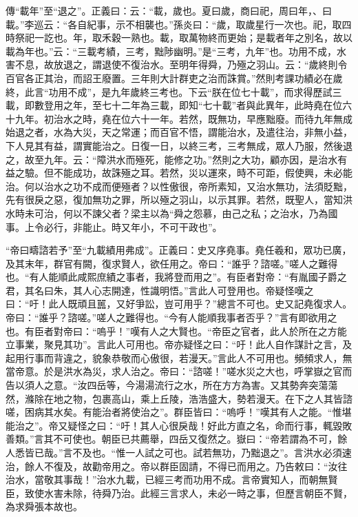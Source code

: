 {\noindent\zhuan{}\fzbyks 傳“載年”至“退之”。正義曰：云：“載，歲也。夏曰歲，商曰祀，周曰年，、曰載。”李巡云：“各自紀事，示不相襲也。”孫炎曰：“歲，取歲星行一次也。祀，取四時祭祀一訖也。年，取禾穀一熟也。載，取萬物終而更始；是載者年之別名，故以載為年也。”云：“三載考績，三考，黜陟幽明。”是“三考，九年”也。功用不成，水害不息，故放退之，謂退使不復治水。至明年得舜，乃殛之羽山。云：“歲終則令百官各正其治，而詔王廢置。三年則大計群吏之治而誅賞。”然則考課功績必在歲終，此言“功用不成”，是九年歲終三考也。下云“朕在位七十載”，而求得歷試三載，即數登用之年，至七十二年為三載，即知“七十載”者與此異年，此時堯在位六十九年。初治水之時，堯在位六十一年。若然，既無功，早應黜廢。而待九年無成始退之者，水為大災，天之常運；而百官不悟，謂能治水，及遣往治，非無小益，下人見其有益，謂實能治之。日復一日，以終三考，三考無成，眾人乃服，然後退之，故至九年。云：“障洪水而殛死，能修之功。”然則之大功，顧亦因，是治水有益之驗。但不能成功，故誅殛之耳。若然，災以運來，時不可距，假使興，未必能治。何以治水之功不成而便殛者？以性傲很，帝所素知，又治水無功，法須貶黜，先有很戾之惡，復加無功之罪，所以殛之羽山，以示其罪。若然，既聖人，當知洪水時未可治，何以不諫父者？梁主以為“舜之怨慕，由己之私；之治水，乃為國事。上令必行，非能止。時又年小，不可干政也”。 \par}

{\noindent\shu{}\fzkt “帝曰疇諮若予”至“九載績用弗成”。正義曰：史又序堯事。堯任羲和，眾功已廣，及其末年，群官有闕，復求賢人，欲任用之。帝曰：“誰乎？諮嗟。”嗟人之難得也。“有人能順此咸熙庶績之事者，我將登而用之”。有臣者對帝：“有胤國子爵之君，其名曰朱，其人心志開達，性識明悟。”言此人可登用也。帝疑怪嘆之曰：“吁！此人既頑且嚚，又好爭訟，豈可用乎？”總言不可也。史又記堯復求人。帝曰：“誰乎？諮嗟。”嗟人之難得也。“今有人能順我事者否乎？”言有即欲用之也。有臣者對帝曰：“嗚乎！”嘆有人之大賢也。“帝臣之官者，此人於所在之方能立事業，聚見其功”。言此人可用也。帝亦疑怪之曰：“吁！此人自作謀計之言，及起用行事而背違之，貌象恭敬而心傲很，若漫天。”言此人不可用也。頻頻求人，無當帝意。於是洪水為災，求人治之。帝曰：“諮嗟！”嗟水災之大也，呼掌嶽之官而告以須人之意。“汝四岳等，今湯湯流行之水，所在方方為害。又其勢奔突蕩蕩然，滌除在地之物，包裹高山，乘上丘陵，浩浩盛大，勢若漫天。在下之人其皆諮嗟，困病其水矣。有能治者將使治之”。群臣皆曰：“嗚呼！”嘆其有人之能。“惟堪能治之”。帝又疑怪之曰：“吁！其人心很戾哉！好此方直之名，命而行事，輒毀敗善類。”言其不可使也。朝臣已共薦舉，四岳又復然之。嶽曰：“帝若謂為不可，餘人悉皆已哉。”言不及也。“惟一人試之可也。試若無功，乃黜退之”。言洪水必須速治，餘人不復及，故勸帝用之。帝以群臣固請，不得已而用之。乃告敕曰：“汝往治水，當敬其事哉！”治水九載，已經三考而功用不成。言帝實知人，而朝無賢臣，致使水害未除，待舜乃治。此經三言求人，未必一時之事，但歷言朝臣不賢，為求舜張本故也。 \par}


